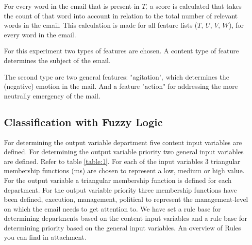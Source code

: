 \documentclass[journal]{IEEEtran}
\begin{document}
    For every word in the email that is present in $T$, a score is calculated 
    that takes the count of that word into account in relation to the total 
    number of relevant words in the email. This calculation is made for all 
    feature lists ($T$, $U$, $V$, $W$), for every word in the email.
    
    For this experiment two types of features are chosen. A content type of feature determines the subject of the email. 
    
    The second type are two general features: "agitation", which determines the (negative) emotion in the mail. And a feature "action" for addressing the more neutrally emergency of the mail. 
    
    
\subsection{Classification with Fuzzy Logic}
    
For determining the output variable department five content input variables are defined. For determining the output variable priority two general input variables are defined. Refer to table \ref{table:1}. For each of the input variables 3 triangular membership functions (ms) are chosen to represent a low, medium or high value. For the output variable a triangular membership function is defined for each department. For the output variable priority three membership functions have been defined, execution, management, political to represent the management-level on which the email needs to get attention to.  We have set a rule base for determining departments based on the content input variables and a rule base for determining priority based on the general input variables. An overview of Rules you can find in attachment. \\
\end{document}
